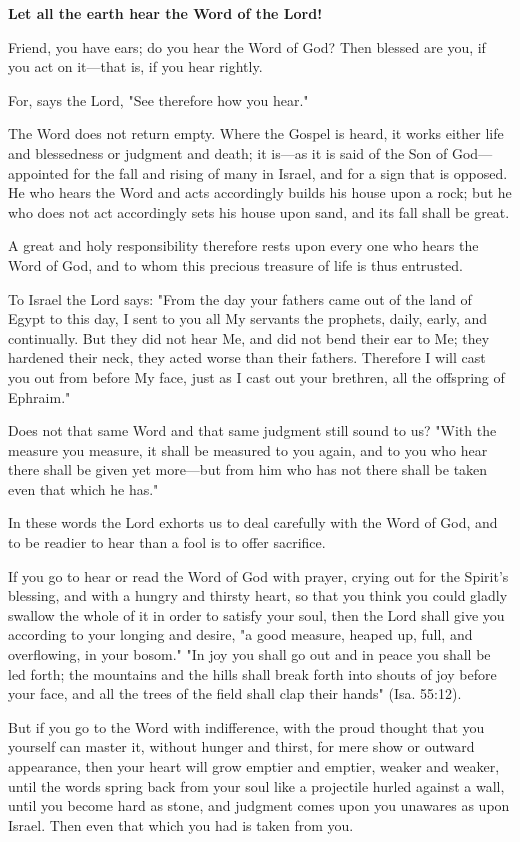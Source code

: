 \textbf{Let all the earth hear the Word of the Lord!}

Friend, you have ears; do you hear the Word of God? Then blessed are you, if you act on it—that is, if you hear rightly.

For, says the Lord, "See therefore how you hear."

The Word does not return empty. Where the Gospel is heard, it works either life and blessedness or judgment and death; it is—as it is said of the Son of God—appointed for the fall and rising of many in Israel, and for a sign that is opposed. He who hears the Word and acts accordingly builds his house upon a rock; but he who does not act accordingly sets his house upon sand, and its fall shall be great.

A great and holy responsibility therefore rests upon every one who hears the Word of God, and to whom this precious treasure of life is thus entrusted.

To Israel the Lord says: "From the day your fathers came out of the land of Egypt to this day, I sent to you all My servants the prophets, daily, early, and continually. But they did not hear Me, and did not bend their ear to Me; they hardened their neck, they acted worse than their fathers. Therefore I will cast you out from before My face, just as I cast out your brethren, all the offspring of Ephraim."

Does not that same Word and that same judgment still sound to us?
"With the measure you measure, it shall be measured to you again, and to you who hear there shall be given yet more—but from him who has not there shall be taken even that which he has."

In these words the Lord exhorts us to deal carefully with the Word of God, and to be readier to hear than a fool is to offer sacrifice.

If you go to hear or read the Word of God with prayer, crying out for the Spirit’s blessing, and with a hungry and thirsty heart, so that you think you could gladly swallow the whole of it in order to satisfy your soul, then the Lord shall give you according to your longing and desire, "a good measure, heaped up, full, and overflowing, in your bosom." "In joy you shall go out and in peace you shall be led forth; the mountains and the hills shall break forth into shouts of joy before your face, and all the trees of the field shall clap their hands" (Isa. 55:12).

But if you go to the Word with indifference, with the proud thought that you yourself can master it, without hunger and thirst, for mere show or outward appearance, then your heart will grow emptier and emptier, weaker and weaker, until the words spring back from your soul like a projectile hurled against a wall, until you become hard as stone, and judgment comes upon you unawares as upon Israel. Then even that which you had is taken from you.

